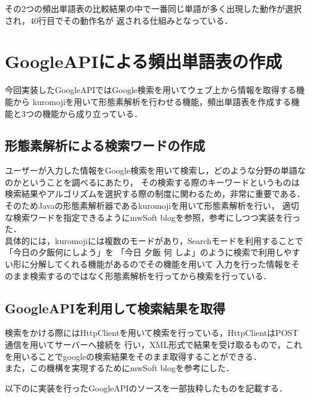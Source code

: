 その2つの頻出単語表の比較結果の中で一番同じ単語が多く出現した動作が選択され，40行目でその動作名が
返される仕組みとなっている．\\




\section{GoogleAPIによる頻出単語表の作成}
今回実装したGoogleAPIではGoogle検索を用いてウェブ上から情報を取得する機能から
kuromojiを用いて形態素解析を行わせる機能，頻出単語表を作成する機能と3つの機能から成り立っている．
\\
\subsection{形態素解析による検索ワードの作成}
ユーザーが入力した情報をGoogle検索を用いて検索し，どのような分野の単語なのかということを調べるにあたり，
その検索する際のキーワードというものは検索結果やアルゴリズムを選択する際の制度に関わるため，非常に重要である．\\

そのためJavaの形態素解析器であるkuromoji\cite{gitkuromoji}を用いて形態素解析を行い，
適切な検索ワードを指定できるようにmwSoft blog\cite{kuromoji}を参照，参考にしつつ実装を行った．\\

具体的には，kuromojiには複数のモードがあり，Searchモードを利用することで「今日の夕飯何にしよう」を
「今日 夕飯 何 しよ」のように検索で利用しやすい形に分解してくれる機能があるのでその機能を用いて
入力を行った情報をそのまま検索するのではなく形態素解析を行ってから検索を行っている．\\



\subsection{GoogleAPIを利用して検索結果を取得}
検索をかける際にはHttpClientを用いて検索を行っている，HttpClientはPOST通信を用いてサーバーへ接続を
行い，XML形式で結果を受け取るもので，これを用いることでgoogleの検索結果をそのまま取得することができる．\\
また，この機構を実現するためにmwSoft blog\cite{google}を参考にした．

以下のに実装を行ったGoogleAPIのソースを一部抜粋したものを記載する．

